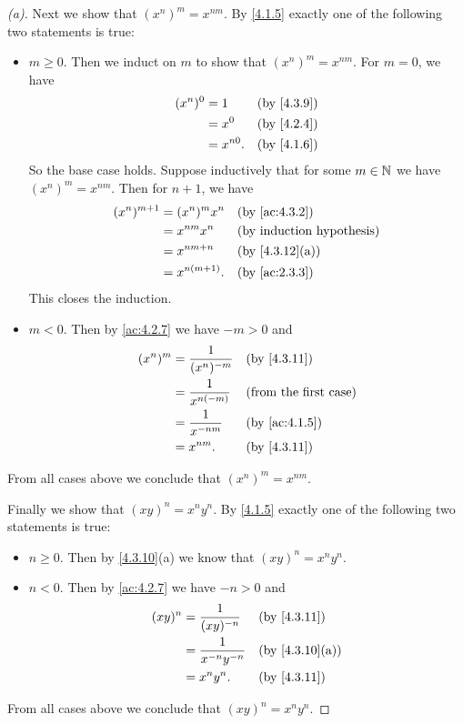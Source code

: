 \begin{proof}[(a)]
  Next we show that \((x^n)^m = x^{nm}\).
  By \cref{4.1.5} exactly one of the following two statements is true:
  \begin{itemize}
    \item \(m \geq 0\).
          Then we induct on \(m\) to show that \((x^n)^m = x^{nm}\).
          For \(m = 0\), we have
          \begin{align*}
            (x^n)^0 & = 1       &  & \by{4.3.9} \\
                    & = x^0     &  & \by{4.2.4} \\
                    & = x^{n0}. &  & \by{4.1.6}
          \end{align*}
          So the base case holds.
          Suppose inductively that for some \(m \in \mathbb{N}\) we have \((x^n)^m = x^{nm}\).
          Then for \(n + 1\), we have
          \begin{align*}
            (x^n)^{m + 1} & = (x^n)^m x^n   &  & \by{ac:4.3.2}  \\
                          & = x^{nm} x^n    &  & \byIH          \\
                          & = x^{nm + n}    &  & \by{4.3.12}[a] \\
                          & = x^{n(m + 1)}. &  & \by{ac:2.3.3}
          \end{align*}
          This closes the induction.
    \item \(m < 0\).
          Then by \cref{ac:4.2.7} we have \(-m > 0\) and
          \begin{align*}
            (x^n)^m & = \dfrac{1}{(x^n)^{-m}} &  & \by{4.3.11}                  \\
                    & = \dfrac{1}{x^{n(-m)}}  &  & \text{(from the first case)} \\
                    & = \dfrac{1}{x^{-nm}}    &  & \by{ac:4.1.5}                \\
                    & = x^{nm}.               &  & \by{4.3.11}
          \end{align*}
  \end{itemize}
  From all cases above we conclude that \((x^n)^m = x^{nm}\).

  Finally we show that \((xy)^n = x^n y^n\).
  By \cref{4.1.5} exactly one of the following two statements is true:
  \begin{itemize}
    \item \(n \geq 0\).
          Then by \cref{4.3.10}(a) we know that \((xy)^n = x^n y^n\).
    \item \(n < 0\).
          Then by \cref{ac:4.2.7} we have \(-n > 0\) and
          \begin{align*}
            (xy)^n & = \dfrac{1}{(xy)^{-n}}     &  & \by{4.3.11}    \\
                   & = \dfrac{1}{x^{-n} y^{-n}} &  & \by{4.3.10}[a] \\
                   & = x^n y^n.                 &  & \by{4.3.11}
          \end{align*}
  \end{itemize}
  From all cases above we conclude that \((xy)^n = x^n y^n\).
\end{proof}

